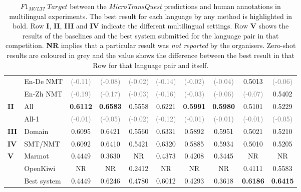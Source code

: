 \begin{table}[t]
\begin{center}
{\begin{tabular}{l l c c c c c c c c}
				& En-De NMT & \textcolor{gray}{(-0.11)} &  \textcolor{gray}{(-0.08)} & \textcolor{gray}{(-0.02)} & \textcolor{gray}{(-0.14)} & \textcolor{gray}{(-0.02)}  & \textcolor{gray}{(-0.04)} & 0.5013 &  \textcolor{gray}{(-0.06)} \\
				& En-Zh NMT & \textcolor{gray}{(-0.19)} &  \textcolor{gray}{(-0.17)} & \textcolor{gray}{(-0.03)} & \textcolor{gray}{(-0.16)} & \textcolor{gray}{(-0.03)}  & \textcolor{gray}{(-0.06)} & \textcolor{gray}{(-0.07)} & 0.5402 \\
				\midrule
				\multirow{2}{*}{\bf II} & All & \textbf{0.6112} &  \textbf{0.6583} & 0.5558 & 0.6221 & \textbf{0.5991} & \textbf{0.5980} & 0.5101 & 0.5229\\
				& All-1 & \textcolor{gray}{(-0.01)} &  \textcolor{gray}{(-0.05)} & \textcolor{gray}{(-0.02)} & \textcolor{gray}{(-0.12)} & \textcolor{gray}{(-0.01)} & \textcolor{gray}{(-0.01)} & \textcolor{gray}{(-0.01)} & \textcolor{gray}{(-0.05)} \\
				\midrule
				\multirow{1}{*}{\bf III} & Domain & 0.6095 &  0.6421 & 0.5560 & 0.6331 & 0.5892 & 0.5951  & 0.5021 &  0.5210 \\
				\midrule
				\multirow{1}{*}{\bf IV} & SMT/NMT & 0.6092 &  0.6410 & 0.5421 & 0.6320 & 0.5885 & 0.5934 & 0.5010 & 0.5205 \\
				\midrule
				\multirow{3}{*}{\bf V} & Marmot & 0.4449 &  0.3630 & NR & 0.4373 & 0.4208 & 0.3445 & NR & NR \\
				& OpenKiwi & NR &  NR & 0.2412 & NR & NR & NR & 0.4111 & 0.5583 \\
				& Best system & 0.4449 &  0.6246 & 0.4780 & 0.6012 & 0.4293 & 0.3618 & \textbf{0.6186} & \textbf{0.6415} \\
				\bottomrule
			\end{tabular}
		}
	\end{center}
	\caption[$F1_{\textit{MULTI}} \; Target$ between the MicroTransQuest predictions and human annotations in multilingual experiments]{$F1_{\textit{MULTI}} \; Target$ between the \textit{MicroTransQuest} predictions and human annotations in multilingual experiments. The best result for each language by any method is highlighted in bold. Row \textbf{I}, \textbf{II}, \textbf{III} and \textbf{IV} indicate the different multilingual settings. Row \textbf{V} shows the results of the baselines and the best system submitted for the language pair in that competition. \textbf{NR} implies that a particular result was \textit{not reported} by the organisers. Zero-shot results are coloured in grey and the value shows the difference between the best result in that Row for that language pair and itself.} 
	\label{tab:multilingual_mt_prediction}
\end{table}


